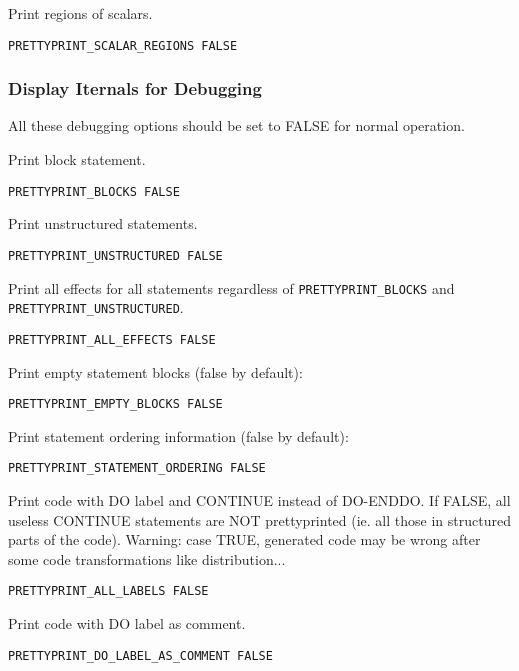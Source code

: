 Print regions of scalars.

\begin{verbatim}
PRETTYPRINT_SCALAR_REGIONS FALSE
\end{verbatim}

\subsubsection{Display Iternals for Debugging}

All these debugging options should be set to FALSE for normal operation.

Print block statement.

\begin{verbatim}
PRETTYPRINT_BLOCKS FALSE
\end{verbatim}

Print unstructured statements.

\begin{verbatim}
PRETTYPRINT_UNSTRUCTURED FALSE
\end{verbatim}

Print all effects for all statements regardless of \verb+PRETTYPRINT_BLOCKS+
and \verb+PRETTYPRINT_UNSTRUCTURED+.

\begin{verbatim}
PRETTYPRINT_ALL_EFFECTS FALSE
\end{verbatim}

Print empty statement blocks (false by default):

\begin{verbatim}
PRETTYPRINT_EMPTY_BLOCKS FALSE
\end{verbatim}

Print statement ordering information (false by default):

\begin{verbatim}
PRETTYPRINT_STATEMENT_ORDERING FALSE
\end{verbatim}

Print code with DO label and CONTINUE instead of DO-ENDDO. If FALSE, all
useless CONTINUE statements are NOT prettyprinted (ie. all those in
structured parts of the code). Warning: case TRUE, generated code may be
wrong after some code transformations like distribution...

\begin{verbatim}
PRETTYPRINT_ALL_LABELS FALSE
\end{verbatim}

Print code with DO label as comment.

\begin{verbatim}
PRETTYPRINT_DO_LABEL_AS_COMMENT FALSE
\end{verbatim}

